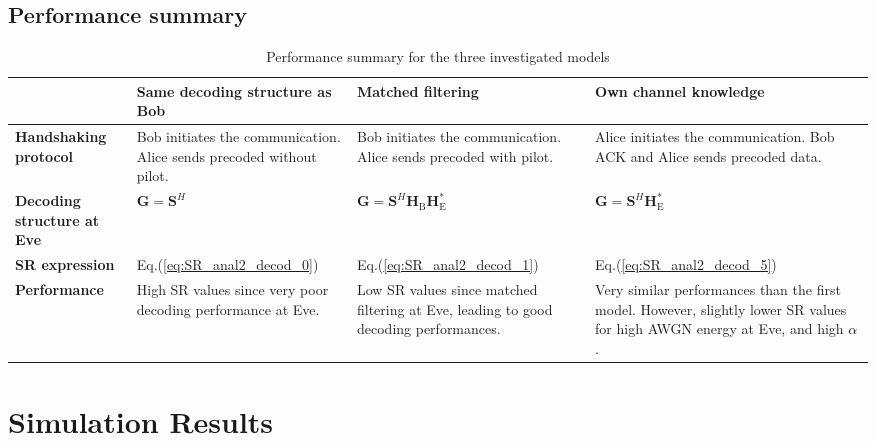 \documentclass[journal,comsoc]{IEEEtran}
\let\MYoriglatexcaption\caption
\renewcommand{\caption}[2][\relax]{\MYoriglatexcaption[#2]{#2}}
\newcommand{\HE}{\textbf{H}_{\text{E}}}
\newcommand{\HB}{\textbf{H}_{\text{B}}}
\newcommand{\spread}{\textbf{S}}
\begin{document}
\subsection{Performance summary}
\begin{table}[!thb]
	\centering
	\begin{tabular}{|p{1.8cm}|p{1.8cm}|p{1.8cm}|p{1.8cm}|}
		\hline
		& \textbf{Same decoding structure as Bob} & \textbf{Matched filtering}  & \textbf{Own channel knowledge}  \\ 
		\hline
		\textbf{Handshaking protocol} & Bob initiates the communication. Alice sends precoded without pilot.
		& Bob initiates the communication. Alice sends precoded with pilot. & Alice initiates the communication. Bob ACK and Alice sends precoded data.\\
		\hline
		\textbf{Decoding structure at Eve} &  $\textbf{G} = \spread^H$ & $\textbf{G} = \spread^H \HB \HE^*$ & $\textbf{G} = \spread^H \HE^*$ \\
		\hline
		\textbf{SR expression} & Eq.(\ref{eq:SR_anal2_decod_0})  &  Eq.(\ref{eq:SR_anal2_decod_1}) & Eq.(\ref{eq:SR_anal2_decod_5})\\
		\hline
		\textbf{Performance} &  High SR values since very poor decoding performance at Eve. & Low SR values since matched filtering at Eve, leading to good decoding performances. & Very similar performances than the first model. However, slightly lower SR values for high AWGN energy at Eve, and high $\alpha$. \\
		\hline
	\end{tabular}
	\caption{Performance summary for the three investigated models}
	\label{tab-perf-summary}
\end{table} 


\section{Simulation Results} \label{sec:simulation-results}



\end{document}
